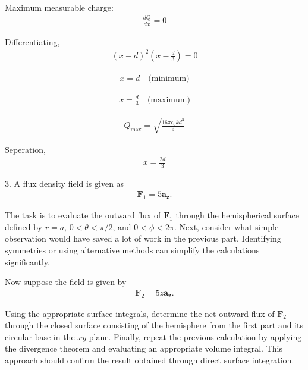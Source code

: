 \documentclass{article}
\begin{document}
Maximum measurable charge:
\begin{align*}
\frac{dQ}{dx} = 0
\end{align*}

Differentiating,
\begin{align*}
(x-d)^2 \left( x - \frac{d}{3} \right) = 0
\end{align*}

\begin{align*}
x = d \quad \text{(minimum)}
\end{align*}

\begin{align*}
x = \frac{d}{3} \quad \text{(maximum)}
\end{align*}

\begin{align*}
Q_{\text{max}} = \sqrt{\frac{16\pi \epsilon_0 k d^3}{9}}
\end{align*}

Seperation,
\begin{align*}
x = \frac{2d}{3}
\end{align*}



3. A flux density field is given as
\begin{align*}
\mathbf{F}_1 = 5\mathbf{a_z}.
\end{align*}

The task is to evaluate the outward flux of $\mathbf{F}_1$ through the hemispherical surface defined by $r = a$, $0 < \theta < \pi/2$, and $0 < \phi < 2\pi$. Next, consider what simple observation would have saved a lot of work in the previous part. Identifying symmetries or using alternative methods can simplify the calculations significantly.

Now suppose the field is given by
\begin{align*}
\mathbf{F}_2 = 5z \mathbf{a_z}.
\end{align*}

Using the appropriate surface integrals, determine the net outward flux of $\mathbf{F}_2$ through the closed surface consisting of the hemisphere from the first part and its circular base in the $xy$ plane. Finally, repeat the previous calculation by applying the divergence theorem and evaluating an appropriate volume integral. This approach should confirm the result obtained through direct surface integration.
\end{document}
